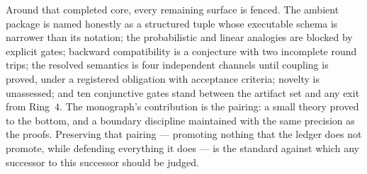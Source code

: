 Around that completed core, every remaining surface is fenced. The ambient
package is named honestly as a structured tuple whose executable schema is
narrower than its notation; the probabilistic and linear analogies are
blocked by explicit gates; backward compatibility is a conjecture with two
incomplete round trips; the resolved semantics is four independent
channels until coupling is proved, under a registered obligation with
acceptance criteria; novelty is unassessed; and ten conjunctive gates
stand between the artifact set and any exit from Ring~4. The monograph's
contribution is the pairing: a small theory proved to the bottom, and a
boundary discipline maintained with the same precision as the proofs.
Preserving that pairing --- promoting nothing that the ledger does not
promote, while defending everything it does --- is the standard against
which any successor to this successor should be judged.

